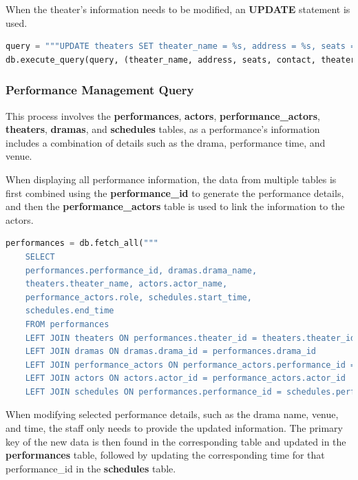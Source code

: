 \documentclass[12pt]{article}
\begin{document}
\par When the theater's information needs to be modified, an \textbf{UPDATE} statement is used.
\begin{tcolorbox}[colframe=black, colback=white, boxrule=0.4mm, sharp corners=southwest, title=Excerpt of Theater Edit Code]
    \begin{lstlisting}[language=Python, breaklines=true]
query = """UPDATE theaters SET theater_name = %s, address = %s, seats = %s, contact_num = %s WHERE theater_id = %s"""
db.execute_query(query, (theater_name, address, seats, contact, theater_id))
\end{lstlisting}
\end{tcolorbox}

\subsubsection{Performance Management Query}
\par This process involves the \textbf{performances}, \textbf{actors}, \textbf{performance\_actors}, \textbf{theaters}, \textbf{dramas}, and \textbf{schedules} tables, as a performance's information includes a combination of details such as the drama, performance time, and venue.
\par When displaying all performance information, the data from multiple tables is first combined using the \textbf{performance\_id} to generate the performance details, and then the \textbf{performance\_actors} table is used to link the information to the actors.
\begin{tcolorbox}[colframe=black, colback=white, boxrule=0.4mm, sharp corners=southwest, title=Excerpt of Performance show Code]
    \begin{lstlisting}[language=Python, breaklines=true]
performances = db.fetch_all("""
    SELECT 
    performances.performance_id, dramas.drama_name, 
    theaters.theater_name, actors.actor_name, 
    performance_actors.role, schedules.start_time,
    schedules.end_time
    FROM performances 
    LEFT JOIN theaters ON performances.theater_id = theaters.theater_id 
    LEFT JOIN dramas ON dramas.drama_id = performances.drama_id
    LEFT JOIN performance_actors ON performance_actors.performance_id = performances.performance_id
    LEFT JOIN actors ON actors.actor_id = performance_actors.actor_id
    LEFT JOIN schedules ON performances.performance_id = schedules.performance_id;""")
\end{lstlisting}
\end{tcolorbox}
\par When modifying selected performance details, such as the drama name, venue, and time, the staff only needs to provide the updated information. The primary key of the new data is then found in the corresponding table and updated in the \textbf{performances} table, followed by updating the corresponding time for that performance\_id in the \textbf{schedules} table.
\end{document}
